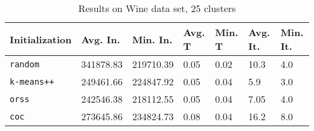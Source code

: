 \begin{table}[h]
	\begin{center}
		\begin{tabular}{|l|l|l|l|l|l|l|}
			\hline
			Initialization & Avg. In. & Min. In. & Avg. T & Min. T & Avg. It. & Min. It.\\\hline
			\texttt{random} & 341878.83 & 219710.39 & 0.05 & 0.02 & 10.3 & 4.0\\\hline
			\texttt{k-means++} & 249461.66 & 224847.92 & 0.05 & 0.04 & 5.9 & 3.0\\\hline
			\texttt{orss} & 242546.38 & 218112.55 & 0.05 & 0.04 & 7.05 & 4.0\\\hline
			\texttt{coc} & 273645.86 & 234824.73 & 0.08 & 0.04 & 16.2 & 8.0\\\hline
		\end{tabular}
		\caption{Results on Wine data set, 25 clusters}
		\label{tbl:Wine25}
	\end{center}
\end{table}

